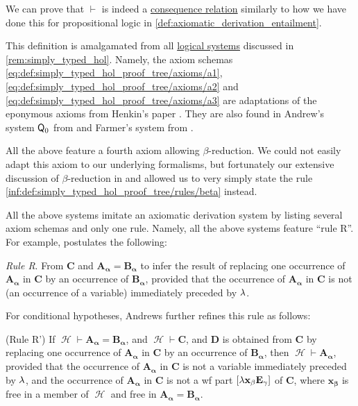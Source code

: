 \begin{defproof}
  We can prove that \( {\vdash} \) is indeed a \hyperref[def:consequence_relation]{consequence relation} similarly to how we have done this for propositional logic in \cref{def:axiomatic_derivation_entailment}.
\end{defproof}
\begin{comments}
  \item This definition is amalgamated from all \hyperref[con:logical_system]{logical systems} discussed in \cref{rem:simply_typed_hol}. Namely, the axiom schemas \eqref{eq:def:simply_typed_hol_proof_tree/axioms/a1}, \eqref{eq:def:simply_typed_hol_proof_tree/axioms/a2} and \eqref{eq:def:simply_typed_hol_proof_tree/axioms/a3} are adaptations of the eponymous axioms from Henkin's paper \cite[37]{Henkin1975Identity}. They are also found in Andrew's system \( \textsf{Q}_0 \) from \cite[\S 51]{Andrews2002Logic} and Farmer's system from \cite[278]{Farmer2008STTVirtues}.

  All the above feature a fourth axiom allowing \( \beta \)-reduction. We could not easily adapt this axiom to our underlying formalisms, but fortunately our extensive discussion of \( \beta \)-reduction in  and  allowed us to very simply state the rule \ref{inf:def:simply_typed_hol_proof_tree/rules/beta} instead.

  All the above systems imitate an axiomatic derivation system by listing several axiom schemas and only one rule. Namely, all the above systems feature \enquote{rule R}. For example,  postulates the following:
  \begin{displayquote}
    \textit{Rule R}. From \( \mathbf{C} \) and \( \mathbf{A_\alpha} = \mathbf{B_\alpha} \) to infer the result of replacing one occurrence of \( \mathbf{A_\alpha} \) in \( \mathbf{C} \) by an occurrence of \( \mathbf{B_\alpha} \), provided that the occurrence of \( \mathbf{A_\alpha} \) in \( \mathbf{C} \) is not (an occurrence of a variable) immediately preceded by \( {\mathrm \lambda} \).
  \end{displayquote}

  For conditional hypotheses, Andrews further refines this rule as follows:
  \begin{displayquote}
    (Rule R') If \( \mscrH \vdash \mathbf{A_\alpha} = \mathbf{B_\alpha} \), and \( \mscrH \vdash \mathbf{C} \), and \( \mathbf{D} \) is obtained from \( \mathbf{C} \) by replacing one occurrence of \( \mathbf{A_\alpha} \) in \( \mathbf{C} \) by an occurrence of \( \mathbf{B_\alpha} \), then \( \mscrH \vdash \mathbf{A_\alpha} \), provided that the occurrence of \( \mathbf{A_\alpha} \) in \( \mathbf{C} \) is not a variable immediately preceded by \( \mathbf{{\mathrm \lambda}} \), and the occurrence of \( \mathbf{A_\alpha} \) in \( \mathbf{C} \) is not a wf part \( [\mathbf{{\mathrm \lambda} x_\beta E_\gamma}] \) of \( \mathbf{C} \), where \( \mathbf{x_\beta} \) is free in a member of \( \mscrH \) and free in \( \mathbf{A_\alpha} = \mathbf{B_\alpha} \).
  \end{displayquote}


\end{comments}
